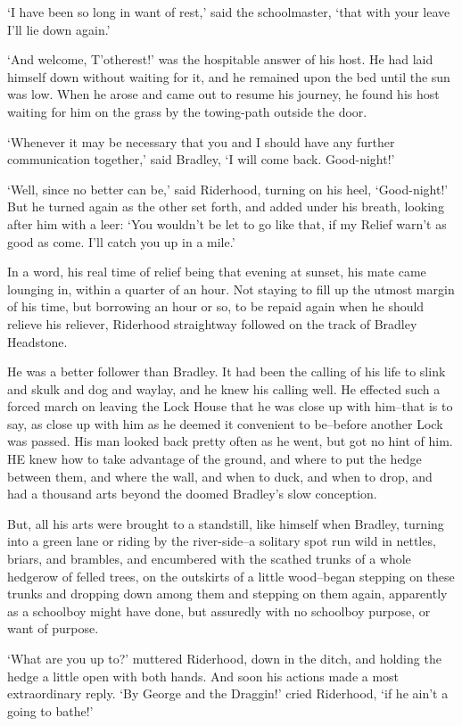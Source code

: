 ‘I have been so long in want of rest,’ said the schoolmaster, ‘that with
your leave I’ll lie down again.’

‘And welcome, T’otherest!’ was the hospitable answer of his host. He had
laid himself down without waiting for it, and he remained upon the bed
until the sun was low. When he arose and came out to resume his journey,
he found his host waiting for him on the grass by the towing-path
outside the door.

‘Whenever it may be necessary that you and I should have any further
communication together,’ said Bradley, ‘I will come back. Good-night!’

‘Well, since no better can be,’ said Riderhood, turning on his heel,
‘Good-night!’ But he turned again as the other set forth, and added
under his breath, looking after him with a leer: ‘You wouldn’t be let to
go like that, if my Relief warn’t as good as come. I’ll catch you up in
a mile.’

In a word, his real time of relief being that evening at sunset, his
mate came lounging in, within a quarter of an hour. Not staying to fill
up the utmost margin of his time, but borrowing an hour or so, to be
repaid again when he should relieve his reliever, Riderhood straightway
followed on the track of Bradley Headstone.

He was a better follower than Bradley. It had been the calling of his
life to slink and skulk and dog and waylay, and he knew his calling
well. He effected such a forced march on leaving the Lock House that he
was close up with him--that is to say, as close up with him as he deemed
it convenient to be--before another Lock was passed. His man looked back
pretty often as he went, but got no hint of him. HE knew how to take
advantage of the ground, and where to put the hedge between them, and
where the wall, and when to duck, and when to drop, and had a thousand
arts beyond the doomed Bradley’s slow conception.

But, all his arts were brought to a standstill, like himself when
Bradley, turning into a green lane or riding by the river-side--a
solitary spot run wild in nettles, briars, and brambles, and encumbered
with the scathed trunks of a whole hedgerow of felled trees, on the
outskirts of a little wood--began stepping on these trunks and dropping
down among them and stepping on them again, apparently as a schoolboy
might have done, but assuredly with no schoolboy purpose, or want of
purpose.

‘What are you up to?’ muttered Riderhood, down in the ditch, and holding
the hedge a little open with both hands. And soon his actions made a
most extraordinary reply. ‘By George and the Draggin!’ cried Riderhood,
‘if he ain’t a going to bathe!’

